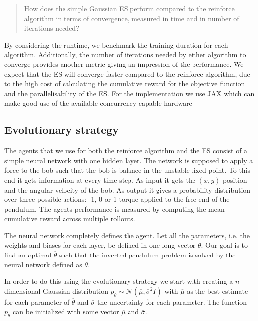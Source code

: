 \documentclass{article}
\begin{document}
\begin{quote}
	How does the simple Gaussian ES perform compared to the reinforce algorithm
	in terms of convergence, measured in time and in number of iterations
	needed?
\end{quote}

By considering the runtime, we benchmark the training duration for each
algorithm. Additionally, the number of iterations needed by either algorithm to
converge provides another metric giving an impression of the performance. We
expect that the ES will converge faster compared to the reinforce algorithm,
due to the high cost of calculating the cumulative reward for the objective
function and the parallelisability of the ES. For the implementation we use JAX
which can make good use of the available concurrency capable hardware.

\subsection{Evolutionary strategy}
\label{sec: evolutionary strategy}
The agents that we use for both the reinforce algorithm and the ES consist of a
simple neural network with one hidden layer. The network is supposed to apply a
force to the bob such that the bob is balance in the unstable fixed point. To
this end it gets information at every time step. As input it gets the $(x, y)$
position and the angular velocity of the bob. As output it gives a probability
distribution over three possible actions: -1, 0 or 1 torque applied to the free
end of the pendulum. The agents performance is measured by computing the mean
cumulative reward across multiple rollouts.

The neural network completely defines the agent. Let all the parameters, i.e.
the weights and biases for each layer, be defined in one long vector
$\overline\theta$. Our goal is to find an optimal $\overline\theta$ such that
the inverted pendulum problem is solved by the neural network defined as
$\overline\theta$.

In order to do this using the evolutionary strategy we start with creating a
$n$-dimensional Gaussian distribution $p_\theta \sim \mathcal{N}(\overline\mu,
\overline\sigma^2 I)$ with $\overline\mu$ as the best estimate for each
parameter of $\overline\theta$ and $\overline\sigma$ the uncertainty for each
parameter. The function $p_\theta$ can be initialized with some vector
$\overline\mu$ and $\overline\sigma$.
\end{document}
